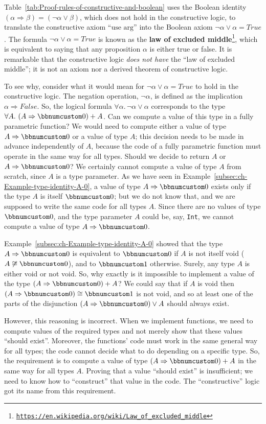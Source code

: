 Table~\ref{tab:Proof-rules-of-constructive-and-boolean} uses the
Boolean identity $\left(\alpha\Rightarrow\beta\right)=(\neg\alpha\vee\beta)$,
which does not hold in the constructive logic, to translate the constructive
axiom ``$\text{use arg}$'' into the Boolean axiom $\neg\alpha\vee\alpha=True$.
The formula $\neg\alpha\vee\alpha=True$ is known as the \textbf{law
of excluded middle}\footnote{\texttt{\href{https://en.wikipedia.org/wiki/Law_of_excluded_middle}{https://en.wikipedia.org/wiki/Law\_of\_excluded\_middle}}},
which is equivalent to saying that any proposition $\alpha$ is either
true or false. It is remarkable that the constructive logic \emph{does
not have} the ``law of excluded middle''; it is not an axiom nor
a derived theorem of constructive logic. 

To see why, consider what it would mean for $\neg\alpha\vee\alpha=True$
to hold in the constructive logic. The negation operation, $\neg\alpha$,
is defined as the implication $\alpha\Rightarrow False$. So, the
logical formula $\forall\alpha.\,\neg\alpha\vee\alpha$ corresponds
to the type $\forall A.\,\left(A\Rightarrow\bbnum 0\right)+A$. Can
we compute a value of this type in a fully parametric function? We
would need to compute either a value of type $A\Rightarrow\bbnum 0$
or a value of type $A$; this decision needs to be made in advance
independently of $A$, because the code of a fully parametric function
must operate in the same way for all types. Should we decide to return
$A$ or $A\Rightarrow\bbnum 0$? We certainly cannot compute a value
of type $A$ from scratch, since $A$ is a type parameter. As we have
seen in Example~\ref{subsec:ch-Example-type-identity-A-0}, a value
of type $A\Rightarrow\bbnum 0$ exists only if the type $A$ is itself
$\bbnum 0$; but we do not know that, and we are supposed to write
the same code for all types $A$. Since there are no values of type
$\bbnum 0$, and the type parameter $A$ could be, say, \lstinline!Int!,
we cannot compute a value of type $A\Rightarrow\bbnum 0$.

Example~\ref{subsec:ch-Example-type-identity-A-0} showed that the
type $A\Rightarrow\bbnum 0$ is equivalent to $\bbnum 0$ if $A$
is not itself void ($A\not\cong\bbnum 0$), and to $\bbnum 1$ otherwise.
Surely, any type $A$ is either void or not void. So, why exactly
is it impossible to implement a value of the type $\left(A\Rightarrow\bbnum 0\right)+A$?
We could say that if $A$ is void then $\left(A\Rightarrow\bbnum 0\right)\cong\bbnum 1$
is not void, and so at least one of the parts of the disjunction $\left(A\Rightarrow\bbnum 0\right)\vee A$
should always exist.

However, this reasoning is incorrect. When we implement functions,
we need to compute values of the required types and not merely show
that these values ``should exist''. Moreover, the functions' code
must work in the same general way for all types; the code cannot decide
what to do depending on a specific type. So, the requirement is to
compute a value of type $\left(A\Rightarrow\bbnum 0\right)+A$ in
the same way for all types $A$. Proving that a value ``should exist''
is insufficient; we need to know how to ``construct'' that value
in the code. The ``constructive'' logic
got its name from this requirement.
